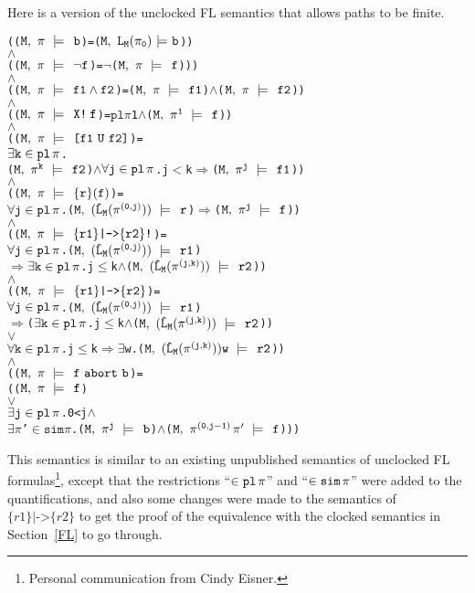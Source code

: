 \documentclass{llncs}
\newcommand{\And}{\(\wedge\)}
\newcommand{\Or}{\(\vee\)}
\newcommand{\Imp}{\(\Rightarrow\)}
\newcommand{\Not}{\(\neg\)}
\newcommand{\Exists}{\(\exists\)}
\newcommand{\In}{\(\in\)}
\newcommand{\pathCat}[2]{#1\hspace*{0.5mm}#2}
\newcommand{\Leq}{\(\leq\)}
\newcommand{\Le}{\(<\)}
\renewcommand{\Pi}{\(\pi\)}
\newcommand{\BSem}[3]{(\(\tt#1,~#2~{\models}~#3\))}
\newcommand{\SSem}[4]{(\(\tt{#1,~#2~\models^{\hspace*{-2.3mm}\raisebox{1mm}{\tt#3}}~#4}\))}
\newcommand{\sSem}[4]{(\tt{#1,~#2~\models^{\hspace*{-2.3mm}\raisebox{1mm}{\tt#3}}~#4})}
\renewcommand{\c}{{\hspace*{2.5mm}}}
\newcommand{\FSem}[4]{(\(\tt{#1,~#2~\models^{\hspace*{-2.3mm}\raisebox{1mm}{\tt#3}}~#4}\))}
\newcommand{\Pl}{\(\texttt{pl}\xspace\)}
\newcommand{\pl}{\texttt{pl}\xspace}
\newcommand{\Sim}{\(\texttt{sim}\xspace\)}
\renewcommand{\sim}{\texttt{sim}\xspace}
\newcommand{\ResExists}[2]{\(\exists{\tt#1}\in\pl\hspace*{0.5mm}#2\)}
\newcommand{\ResForall}[2]{\(\forall{\tt#1}\in\pl\hspace*{0.5mm}#2\)}
\newcommand{\FBool}[1]{#1}
\newcommand{\fNot}[1]{\neg#1}
\newcommand{\restN}[2]{#1^{#2}}
\newcommand{\pathEl}[2]{#1_{#2}}
\newcommand{\pathSeg}[2]{#1^{#2}}
\newcommand{\lHat}[1]{\hat{\texttt{L}}_{#1}}
\newcommand{\lNoHat}[1]{{\texttt{L}}_{#1}}
\newcommand{\fAnd}[2]{#1 \wedge #2}
\newcommand{\fNext}[1]{\texttt{X!}\hspace*{0.8mm}#1}
\newcommand{\fUntil}[2]{\texttt{[}#1~\texttt{U}~#2\texttt{]}}
\newcommand{\fSuffixImp}[2]{\{#1\}(#2)}
\newcommand{\fStrongImp}[2]{\{#1\}\texttt{|->}\{#2\}\texttt{!}}
\newcommand{\fWeakImp}[2]{\{#1\}\texttt{|->}\{#2\}}
\newcommand{\fAbort}[2]{#1~\texttt{abort}~#2}
\begin{document}
Here is a version of the unclocked FL semantics that allows
paths to be finite.


{\begin{alltt}

    ({\FSem{M}{{\pi}}{{\c}}{\FBool{b}}} = {\BSem{M}{\lNoHat{M}(\pathEl{{\pi}}{0})}{b}})
    {\And}
    ({\FSem{M}{{\pi}}{{\c}}{\fNot{f}}} = {\Not}{\FSem{M}{{\pi}}{\c}{f}}))
    {\And}
    ({\FSem{M}{{\pi}}{{\c}}{\fAnd{f1}{f2}}} = {\FSem{M}{\pi}{{\c}}{f1}} {\And} {\FSem{M}{\pi}{{\c}}{f2}})
    {\And}
    ({\FSem{M}{{\pi}}{{\c}}{\fNext{f}}} = {\Pl \Pi 1} \And {\FSem{M}{\restN{{\pi}}{1}}{{\c}}{f}})
    {\And}
    ({\FSem{M}{{\pi}}{{\c}}{\fUntil{f1}{f2}}} = 
      {\ResExists{k}{\pi}}. 
       {\FSem{M}{\restN{{\pi}}{k}}{\c}{f2}} \And {\ResForall{j}{\pi}}. j {\Le} k \Imp {\FSem{M}{\restN{{\pi}}{j}}{{\c}}{f1}})
    {\And}
    ({\FSem{M}{{\pi}}{{\c}}{\fSuffixImp{r}{f}}} = 
      {\ResForall{j}{\pi}}. \SSem{M}{(\lHat{M} (\pathSeg{\pi}{(0,j)}))}{\c}{r} {\Imp} {\FSem{M}{\restN{{\pi}}{j}}{{\c}}{f}})
    {\And}
    ({\FSem{M}{{\pi}}{{\c}}{\fStrongImp{r1}{r2}}} = 
      {\ResForall{j}{\pi}}. \SSem{M}{(\lHat{M} (\pathSeg{\pi}{(0,j)}))}{\c}{r1} 
                {\Imp} {\ResExists{k}{\pi}}. j \Leq k \And \SSem{M}{(\lHat{M} (\pathSeg{\pi}{(j,k)}))}{\c}{r2})
    {\And}
    ({\FSem{M}{{\pi}}{{\c}}{\fWeakImp{r1}{r2}}} = 
      {\ResForall{j}{\pi}}. \SSem{M}{(\lHat{M} (\pathSeg{\pi}{(0,j)}))}{\c}{r1} 
                \Imp ({\ResExists{k}{\pi}}. j \Leq k \And \SSem{M}{(\lHat{M} (\pathSeg{\pi}{(j,k)}))}{\c}{r2})
                   \Or
                   {\ResForall{k}{\pi}}. j \Leq k \Imp {\Exists}w. \SSem{M}{(\lHat{M} (\pathSeg{\pi}{(j,k)}))w}{\c}{r2})
    {\And}
    ({\FSem{M}{{\pi}}{{\c}}{\fAbort{f}{b}}} =
      ({\FSem{M}{\pi}{{\c}}{f }}
       {\Or}
       {\ResExists{j}{\pi}}. 0 < j \And
        \Exists{\Pi}'\In\Sim {\Pi}. {\FSem{M}{\restN{{\pi}}{j}}{\c}{{\FBool{b}}}} {\And} {\FSem{M}{\pathCat{\pathSeg{\pi}{(0,j-1)}}{{\pi}'}}{{\c}}{f}}))
\end{alltt}}

This semantics is similar to an existing unpublished semantics of unclocked 
FL formulas\footnote{Personal communication from Cindy Eisner.},
except that the restrictions ``$\in\pl\hspace*{0.5mm}\pi$'' and ``$\in\sim\hspace*{0.5mm}\pi$'' were added to the quantifications,
and also some changes were made to
the semantics of $\fWeakImp{r1}{r2}$ to get the proof of the equivalence with the clocked semantics
in Section~\ref{FL} to go through.
\end{document}
